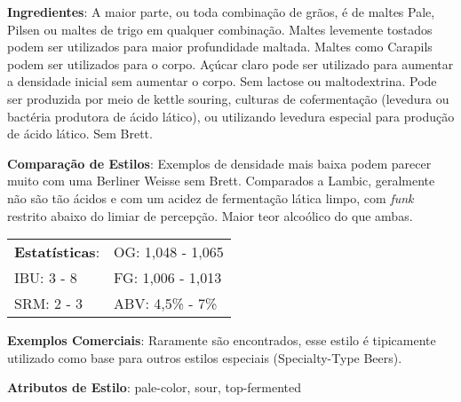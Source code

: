 \textbf{Ingredientes}: A maior parte, ou toda combinação de grãos, é de maltes Pale, Pilsen ou maltes de trigo em qualquer combinação. Maltes levemente tostados podem ser utilizados para maior profundidade maltada. Maltes como Carapils podem ser utilizados para o corpo. Açúcar claro pode ser utilizado para aumentar a densidade inicial sem aumentar o corpo. Sem lactose ou maltodextrina. Pode ser produzida por meio de kettle souring, culturas de cofermentação (levedura ou bactéria produtora de ácido lático), ou utilizando levedura especial para produção de ácido lático. Sem Brett.

\textbf{Comparação de Estilos}: Exemplos de densidade mais baixa podem parecer muito com uma Berliner Weisse sem Brett. Comparados a Lambic, geralmente não são tão ácidos e com um acidez de fermentação lática limpo, com \textit{funk} restrito abaixo do limiar de percepção. Maior teor alcoólico do que ambas.

\begin{tabular}{@{}p{35mm}p{35mm}@{}}
  \textbf{Estatísticas}: & OG: 1,048 - 1,065 \\
  IBU: 3 - 8  & FG: 1,006 - 1,013 \\
  SRM: 2 - 3  & ABV: 4,5\% - 7\%
\end{tabular}

\textbf{Exemplos Comerciais}: Raramente são encontrados, esse estilo é tipicamente utilizado como base para outros estilos especiais (Specialty-Type Beers).

\textbf{Atributos de Estilo}: pale-color, sour, top-fermented
